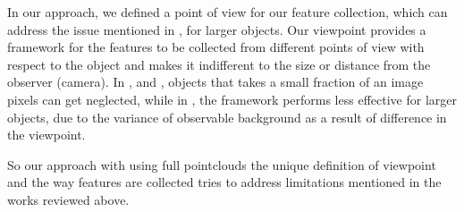      In our approach, we defined a point of view for our feature collection, which can address the issue mentioned in \cite{aydemir2012_3Dcontext}, for larger objects. Our viewpoint provides a framework for the features to be collected from different points of view with respect to the object and makes it indifferent to the size or distance from the observer (camera). In \cite{TorralbaContextualPriming}, \cite{TrollbaContexBased} and \cite{PerkoLeonardisContextDriven}, objects that takes a small fraction of an image pixels can get neglected, while in \cite{aydemir2012_3Dcontext}, the framework performs less effective for larger objects, due to the variance of observable background as a result of difference in the viewpoint. 
     
     So our approach with using full pointclouds the unique definition of viewpoint and the way features are collected tries to address limitations mentioned in the works reviewed above.
     
     
      
      
     
